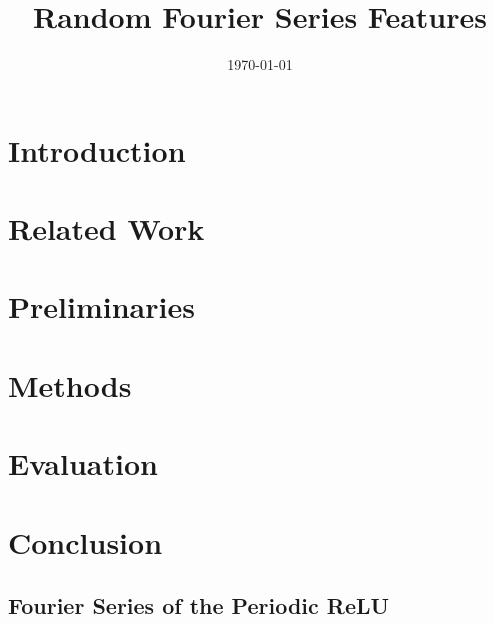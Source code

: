 \documentclass[11pt, a4paper, conference, romanappendices, twocolumn]{IEEEtran}
\begin{document}
    \title{Random Fourier Series Features}
    \author{
        \and
        \and
    }
    \date{\today}
    
    \maketitle
    
    \begin{abstract}
        
    \end{abstract}
    
    \section{Introduction}
    
    
    \section{Related Work}
    
    
    \section{Preliminaries}
    
    
    \section{Methods}
    
    
    \section{Evaluation}
    
    
    \section{Conclusion}
    
    
    \FloatBarrier
    
    
    \FloatBarrier
    
    \appendix
    \subsection{Fourier Series of the Periodic ReLU}  \label{app:perelu}
    
\end{document}

